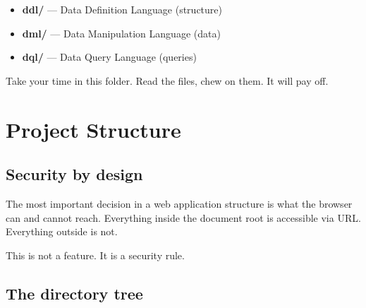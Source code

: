 \documentclass[11pt,a4paper,oneside]{book}
\providecommand{\tightlist}{%
  \setlength{\itemsep}{0pt}\setlength{\parskip}{0pt}}
\begin{document}
\begin{itemize}
\tightlist
\item
  \textbf{ddl/} --- Data Definition Language (structure)
\item
  \textbf{dml/} --- Data Manipulation Language (data)
\item
  \textbf{dql/} --- Data Query Language (queries)
\end{itemize}

Take your time in this folder. Read the files, chew on them. It
will pay off.

\newpage

\hypertarget{project-structure}{%
\chapter{Project Structure}\label{project-structure}}

\hypertarget{security-by-design}{%
\section{Security by design}\label{security-by-design}}

The most important decision in a web application structure is
what the browser can and cannot reach. Everything inside the
document root is accessible via URL. Everything outside is not.

This is not a feature. It is a security rule.

\hypertarget{the-directory-tree}{%
\section{The directory tree}\label{the-directory-tree}}
\end{document}
